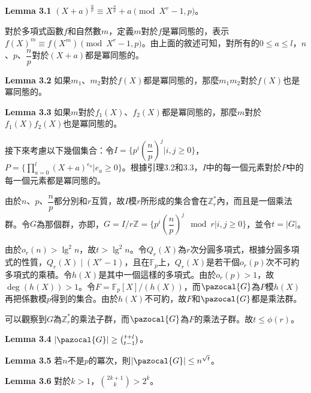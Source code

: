 \documentclass{article}
\newcommand{\Gc}{\pazocal{G}}
\begin{document}
\begin{mdframed}
    \noindent\textbf{Lemma 3.1} $(X+a)^{\frac{n}{p}}\equiv X^{\frac{n}{p}}+a\pmod{X^r-1, p}$。
\end{mdframed}

    對於多項式函數$f$和自然數$m$，定義$m$對於$f$是冪同態的，表示$f(X)^m\equiv f(X^m)\pmod{X^r-1, p}$。由上面的敘述可知，對所有的$0\leq a\leq l$，$n$、$p$、$\dfrac{n}{p}$對於$(X+a)$都是冪同態的。

\begin{mdframed}
\noindent\textbf{Lemma 3.2} 如果$m_1$、$m_2$對於$f(X)$都是冪同態的，那麼$m_1m_2$對於$f(X)$也是冪同態的。
\end{mdframed}

\begin{mdframed}

\noindent\textbf{Lemma 3.3} 如果$m$對於$f_1(X)$、$f_2(X)$都是冪同態的，那麼$m$對於$f_1(X)f_2(X)$也是冪同態的。
\end{mdframed}

    接下來考慮以下幾個集合：令$I=\{p^i(\dfrac{n}{p})^j|i, j\geq 0\}$，$P=\{\prod\limits_{a=0}^{l}(X+a)^{e_a}|e_a\geq 0\}$。根據引理3.2和3.3，$I$中的每一個元素對於$P$中的每一個元素都是冪同態的。
    
    由於$n$、$p$、$\dfrac{n}{p}$都分別和$r$互質，故$I$模$r$所形成的集合會在$\mathbb{Z}_r^*$內，而且是一個乘法群。令$G$為那個群，亦即，$G=I/r\mathbb{Z}=\{p^i(\dfrac{n}{p})^j \mod r|i, j\geq 0\}$，並令$t=|G|$。
    
    由於$o_r(n)>\lg^2n$，故$t>\lg^2n$。令$Q_r(X)$為$r$次分圓多項式，根據分圓多項式的性質，$Q_r(X)\mid (X^r-1)$，且在$\mathbb{F}_p$上，$Q_r(X)$是若干個$o_r(p)$次不可約多項式的乘積。令$h(X)$是其中一個這樣的多項式。由於$o_r(p)>1$，故$\deg(h(X))>1$。令$F=\mathbb{F}_p[X]/(h(X))$，而$\Gc$為$P$模$h(X)$再把係數模$p$得到的集合。由於$h(X)$不可約，故$F$和$\Gc$都是乘法群。

    可以觀察到$G$為$\mathbb{Z}_r^*$的乘法子群，而$\Gc$為$F$的乘法子群。故$t\leq\phi(r)$。

\begin{mdframed}
\noindent\textbf{Lemma 3.4} $|\Gc|\geq\binom{t+l}{t-1}$。
\end{mdframed}

\begin{mdframed}
\noindent\textbf{Lemma 3.5} 若$n$不是$p$的冪次，則$|\Gc|\leq n^{\sqrt{t}}$。
\end{mdframed}

\begin{mdframed}
\noindent\textbf{Lemma 3.6} 對於$k>1$，$\binom{2k+1}{k}>2^k$。
\end{mdframed}
\end{document}
